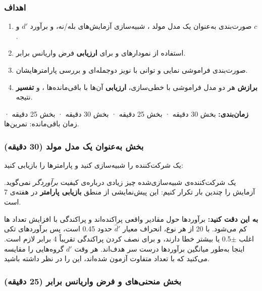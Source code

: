 \subsubsection{اهداف}

\begin{enumerate}
\def\labelenumi{\arabic{enumi}.}
\tightlist
\item
  صورت‌بندی  به‌عنوان یک مدل مولد ، شبیه‌سازی
  آزمایش‌های بله/نه، و برآورد \(d'\) و \(c\).
\item
  استفاده از نمودارهای  و  برای \textbf{ارزیابی} فرض
  واریانس برابر.
\item
  صورت‌بندی فراموشی نمایی و توانی با نویز دوجمله‌ای و بررسی
  پارامترهایشان.
\item
  \textbf{برازش} هر دو مدل فراموشی با خطی‌سازی، \textbf{ارزیابی} آن‌ها با
  باقی‌مانده‌ها ، و \textbf{تفسیر} نتیجه.
\end{enumerate}

\textbf{زمان‌بندی:} بخش  30 دقیقه · بخش  25 دقیقه · بخش
 30 دقیقه · بخش  25 دقیقه · زمان باقی‌مانده: تمرین‌ها.

\subsubsection{\texorpdfstring{بخش  به‌عنوان یک مدل مولد (30
دقیقه)}{بخش A: SDT به‌عنوان یک مدل مولد (30 دقیقه)}}

یک شرکت‌کننده را شبیه‌سازی کنید و پارامترها را بازیابی کنید:

یک شرکت‌کننده‌ی شبیه‌سازی‌شده چیز زیادی درباره‌ی کیفیت \emph{برآوردگر}
نمی‌گوید. آزمایش را چندین بار تکرار کنیم: این پیش‌نمایشی از منطق
\textbf{بازیابی پارامتر} در هفته‌ی 7 است.

\textbf{به این دقت کنید:} برآوردها حول مقادیر واقعی پراکنده‌اند و
پراکندگی با افزایش تعداد ها کم می‌شود. با 20  از هر
نوع، انحراف معیار \(\hat d'\) حدود 0.45 است، پس برآوردهای تکی اغلب \ensuremath{\pm}0.5
یا بیشتر خطا دارند، و برای نصف کردن پراکندگی تقریباً 4 برابر 
لازم است. اینجا به‌طور میانگین برآوردها درست سر هدف‌اند. هر وقت \(d'\)
گروه‌هایی را مقایسه می‌کنید که با تعداد  متفاوت آزمون شده‌اند،
این را در نظر داشته باشید.

\subsubsection{\texorpdfstring{بخش  منحنی‌های  و فرض
واریانس برابر (25
دقیقه)}{بخش B: منحنی‌های ROC و فرض واریانس برابر (25 دقیقه)}}

